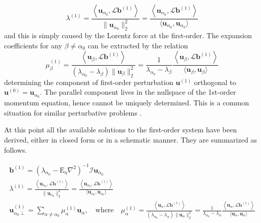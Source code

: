 %
\begin{equation}
    \lambda^{(1)} = \frac{\left\langle \mathbf{u}_{\alpha_0}, \mathcal{L} \mathbf{b}^{(1)} \right\rangle}{\|\mathbf{u}_{\alpha_0}\|_2^2} = \frac{\left\langle \mathbf{u}_{\alpha_0}, \mathcal{L} \mathbf{b}^{(1)} \right\rangle}{\langle \mathbf{u}_{\alpha_0}, \mathbf{u}_{\alpha_0} \rangle}
\end{equation}
%
and this is simply caused by the Lorentz force at the first-order. The expansion coefficients for any $\beta \neq \alpha_0$ can be extracted by the relation
%
\begin{equation}
    \mu_\beta^{(1)} = \frac{\left\langle \mathbf{u}_{\beta}, \mathcal{L} \mathbf{b}^{(1)} \right\rangle}{\left(\lambda_{\alpha_0} - \lambda_\beta\right)\|\mathbf{u}_{\beta}\|_2^2} = \frac{1}{\lambda_{\alpha_0} - \lambda_\beta} \frac{\left\langle \mathbf{u}_{\beta}, \mathcal{L} \mathbf{b}^{(1)} \right\rangle}{\langle \mathbf{u}_{\beta}, \mathbf{u}_{\beta} \rangle}
\end{equation}
%
determining the component of first-order perturbation $\mathbf{u}^{(1)}$ orthogonal to $\mathbf{u}^{(0)} = \mathbf{u}_{\alpha_0}$. The parallel component lives in the nullspace of the 1st-order momentum equation, hence cannot be uniquely determined. This is a common situation for similar perturbative problems \citep[e.g.][]{maitra_waves_2023}.

At this point all the available solutions to the first-order system have been derived, either in closed form or in a schematic manner. They are summarized as follows.
%
\begin{mdframed}[style=HighlightBox, frametitle={General formulae for first-order perturbations}]
\begin{gather*}
    \mathbf{b}^{(1)} = \left(\lambda_{\alpha_0} - \mathrm{E}_\eta \nabla^2\right)^{-1} \mathcal{I} \mathbf{u}_{\alpha_0}
    \\
    \lambda^{(1)} = \frac{\left\langle \mathbf{u}_{\alpha_0}, \mathcal{L} \mathbf{b}^{(1)} \right\rangle}{\|\mathbf{u}_{\alpha_0}\|_2^2} = \frac{\left\langle \mathbf{u}_{\alpha_0}, \mathcal{L} \mathbf{b}^{(1)} \right\rangle}{\langle \mathbf{u}_{\alpha_0}, \mathbf{u}_{\alpha_0} \rangle}
    \\
    \mathbf{u}^{(1)}_{\alpha_0 \perp} = \sum_{\alpha \neq \alpha_0} \mu_\alpha^{(1)} \mathbf{u}_{\alpha},\quad \text{where} \quad 
    \mu_\alpha^{(1)} = \frac{\left\langle \mathbf{u}_{\alpha}, \mathcal{L} \mathbf{b}^{(1)} \right\rangle}{\left(\lambda_{\alpha_0} - \lambda_\alpha\right)\|\mathbf{u}_{\alpha}\|_2^2} = \frac{1}{\lambda_{\alpha_0} - \lambda_\alpha} \frac{\left\langle \mathbf{u}_{\alpha}, \mathcal{L} \mathbf{b}^{(1)} \right\rangle}{\langle \mathbf{u}_{\alpha}, \mathbf{u}_{\alpha} \rangle}
\end{gather*}
\end{mdframed}

